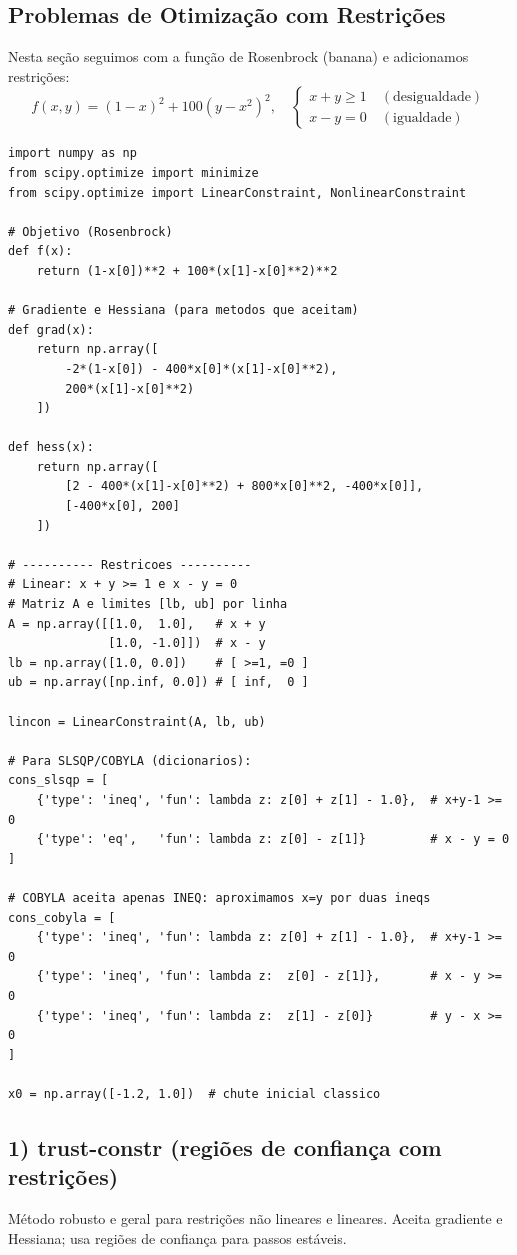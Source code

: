 \documentclass[9pt,a4paper]{extarticle}
\begin{document}
\subsection{Problemas de Otimização com Restrições}

Nesta seção seguimos com a função de Rosenbrock (banana) e adicionamos restrições:
\[
f(x,y) = (1-x)^2 + 100(y-x^2)^2, \quad
\begin{cases}
x + y \ge 1 \quad (\text{desigualdade}) \\
x - y = 0 \quad (\text{igualdade})
\end{cases}
\]

\begin{lstlisting}
import numpy as np
from scipy.optimize import minimize
from scipy.optimize import LinearConstraint, NonlinearConstraint

# Objetivo (Rosenbrock)
def f(x):
    return (1-x[0])**2 + 100*(x[1]-x[0]**2)**2

# Gradiente e Hessiana (para metodos que aceitam)
def grad(x):
    return np.array([
        -2*(1-x[0]) - 400*x[0]*(x[1]-x[0]**2),
        200*(x[1]-x[0]**2)
    ])

def hess(x):
    return np.array([
        [2 - 400*(x[1]-x[0]**2) + 800*x[0]**2, -400*x[0]],
        [-400*x[0], 200]
    ])

# ---------- Restricoes ----------
# Linear: x + y >= 1 e x - y = 0
# Matriz A e limites [lb, ub] por linha
A = np.array([[1.0,  1.0],   # x + y
              [1.0, -1.0]])  # x - y
lb = np.array([1.0, 0.0])    # [ >=1, =0 ]
ub = np.array([np.inf, 0.0]) # [ inf,  0 ]

lincon = LinearConstraint(A, lb, ub)

# Para SLSQP/COBYLA (dicionarios):
cons_slsqp = [
    {'type': 'ineq', 'fun': lambda z: z[0] + z[1] - 1.0},  # x+y-1 >= 0
    {'type': 'eq',   'fun': lambda z: z[0] - z[1]}         # x - y = 0
]

# COBYLA aceita apenas INEQ: aproximamos x=y por duas ineqs
cons_cobyla = [
    {'type': 'ineq', 'fun': lambda z: z[0] + z[1] - 1.0},  # x+y-1 >= 0
    {'type': 'ineq', 'fun': lambda z:  z[0] - z[1]},       # x - y >= 0
    {'type': 'ineq', 'fun': lambda z:  z[1] - z[0]}        # y - x >= 0
]

x0 = np.array([-1.2, 1.0])  # chute inicial classico
\end{lstlisting}

\subsection*{1) trust-constr (regiões de confiança com restrições)}
Método robusto e geral para restrições não lineares e lineares. Aceita gradiente e Hessiana; usa regiões de confiança para passos estáveis.
\end{document}
